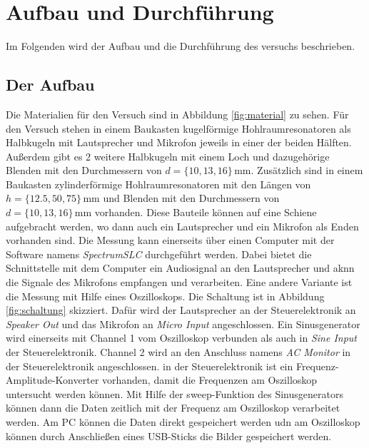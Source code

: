 \section{Aufbau und Durchführung}
\label{sec:auf_durch}

Im Folgenden wird der Aufbau und die Durchführung des versuchs beschrieben.

\subsection{Der Aufbau}
\label{sec:aufbau}

Die Materialien für den Versuch sind in Abbildung \ref{fig:material} zu sehen. Für den Versuch stehen in einem Baukasten kugelförmige Hohlraumresonatoren als Halbkugeln mit Lautsprecher und Mikrofon jeweils in einer der beiden Hälften. Außerdem gibt es 2 weitere Halbkugeln mit einem Loch und dazugehörige Blenden mit den Durchmessern von $d = \{ 10, 13, 16 \} \, \mathrm{mm}$. Zusätzlich sind in einem Baukasten zylinderförmige Hohlraumresonatoren mit den Längen von $h = \{12.5, 50, 75\} \, \mathrm{mm}$ und Blenden mit den Durchmessern von $d = \{ 10, 13, 16 \} \, \mathrm{mm}$ vorhanden. Diese Bauteile können auf eine Schiene aufgebracht werden, wo dann auch ein Lautsprecher und ein Mikrofon als Enden vorhanden sind. Die Messung kann einerseits über einen Computer mit der Software namens \textit{SpectrumSLC} durchgeführt werden. Dabei bietet die Schnittstelle mit dem Computer ein Audiosignal an den Lautsprecher und aknn die Signale des Mikrofons empfangen und verarbeiten. Eine andere Variante ist die Messung mit Hilfe eines Oszilloskops. Die Schaltung ist in Abbildung \ref{fig:schaltung} skizziert. Dafür wird der Lautsprecher an der Steuerelektronik an \textit{Speaker Out} und das Mikrofon an \textit{Micro Input} angeschlossen. Ein Sinusgenerator wird einerseits mit Channel 1 vom Oszilloskop verbunden als auch in \textit{Sine Input} der Steuerelektronik. Channel 2 wird an den Anschluss namens \textit{AC Monitor} in der Steuerelektronik angeschlossen. in der Steuerelektronik ist ein Frequenz-Amplitude-Konverter vorhanden, damit die Frequenzen am Oszilloskop untersucht werden können. Mit Hilfe der sweep-Funktion des Sinusgenerators können dann die Daten zeitlich mit der Frequenz am Oszilloskop verarbeitet werden. Am PC können die Daten direkt gespeichert werden udn am Oszilloskop können durch Anschließen eines USB-Sticks die Bilder gespeichert werden.


